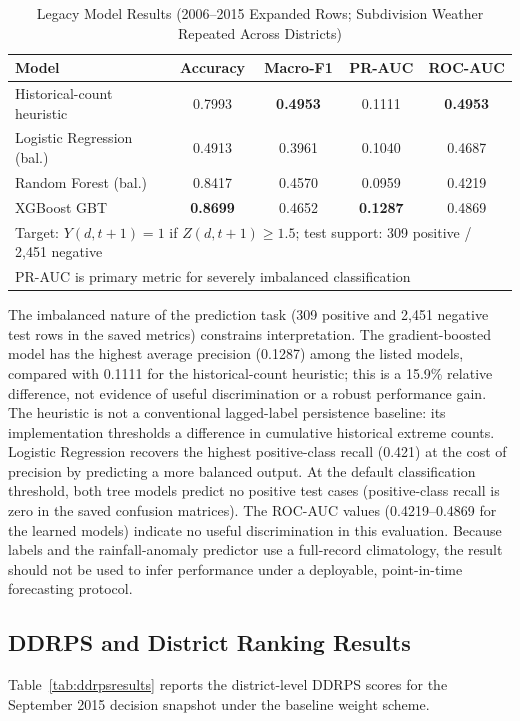 \documentclass[conference]{IEEEtran}
\begin{document}
\begin{table}[t]
\caption{Legacy Model Results (2006--2015 Expanded Rows; Subdivision Weather Repeated Across Districts)}
\label{tab:modelresults}
\centering
\footnotesize
\begin{tabular}{@{}lcccc@{}}
\toprule
Model & Accuracy & Macro-F1 & PR-AUC & ROC-AUC \\
\midrule
Historical-count heuristic  & 0.7993 & \textbf{0.4953} & 0.1111 & \textbf{0.4953} \\
Logistic Regression (bal.)  & 0.4913 & 0.3961 & 0.1040 & 0.4687 \\
Random Forest (bal.)        & 0.8417 & 0.4570 & 0.0959 & 0.4219 \\
XGBoost GBT                 & \textbf{0.8699} & 0.4652 & \textbf{0.1287} & 0.4869 \\
\midrule
\multicolumn{5}{l}{\footnotesize Target: $Y(d,t+1)=1$ if $Z(d,t+1)\geq1.5$; test support: 309 positive / 2,451 negative} \\
\multicolumn{5}{l}{\footnotesize PR-AUC is primary metric for severely imbalanced classification} \\
\bottomrule
\end{tabular}
\end{table}

The imbalanced nature of the prediction task (309 positive and 2,451 negative
test rows in the saved metrics) constrains interpretation. The gradient-boosted
model has the highest average precision (0.1287) among the listed models,
compared with 0.1111 for the historical-count heuristic; this is a 15.9\%
relative difference, not evidence of useful discrimination or a robust
performance gain. The heuristic is not a conventional lagged-label persistence
baseline: its implementation thresholds a difference in cumulative historical
extreme counts.
Logistic Regression recovers the highest positive-class recall (0.421)
at the cost of precision by predicting a more balanced output.
At the default classification threshold, both tree models predict no positive
test cases (positive-class recall is zero in the saved confusion matrices).
The ROC-AUC values (0.4219--0.4869 for the learned models) indicate no useful
discrimination in this evaluation. Because labels and the rainfall-anomaly
predictor use a full-record climatology, the result should not be used to infer
performance under a deployable, point-in-time forecasting protocol.

\subsection{DDRPS and District Ranking Results}
Table~\ref{tab:ddrpsresults} reports the district-level DDRPS scores for
the September 2015 decision snapshot under the baseline weight scheme.
\end{document}
